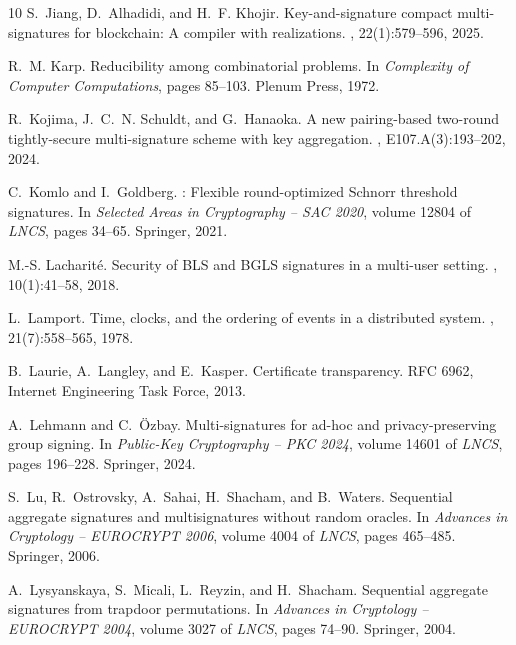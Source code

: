 \documentclass[11pt]{article}
\theoremstyle{definition}
\begin{document}
\begin{thebibliography}{10}
S.~Jiang, D.~Alhadidi, and H.~F. Khojir.
\newblock Key-and-signature compact multi-signatures for blockchain: A compiler
  with realizations.
,
  22(1):579--596, 2025.

R.~M. Karp.
\newblock Reducibility among combinatorial problems.
\newblock In {\em Complexity of Computer Computations}, pages 85--103. Plenum
  Press, 1972.

R.~Kojima, J.~C.~N. Schuldt, and G.~Hanaoka.
\newblock A new pairing-based two-round tightly-secure multi-signature scheme
  with key aggregation.
, E107.A(3):193--202, 2024.

C.~Komlo and I.~Goldberg.
: Flexible round-optimized {Schnorr} threshold signatures.
\newblock In {\em Selected Areas in Cryptography -- SAC 2020}, volume 12804 of
  {\em LNCS}, pages 34--65. Springer, 2021.

M.-S. Lacharit{\'e}.
\newblock Security of {BLS} and {BGLS} signatures in a multi-user setting.
, 10(1):41--58, 2018.

L.~Lamport.
\newblock Time, clocks, and the ordering of events in a distributed system.
, 21(7):558--565, 1978.

B.~Laurie, A.~Langley, and E.~Kasper.
\newblock Certificate transparency.
\newblock RFC 6962, Internet Engineering Task Force, 2013.

A.~Lehmann and C.~{\"O}zbay.
\newblock Multi-signatures for ad-hoc and privacy-preserving group signing.
\newblock In {\em Public-Key Cryptography -- PKC 2024}, volume 14601 of {\em
  LNCS}, pages 196--228. Springer, 2024.

S.~Lu, R.~Ostrovsky, A.~Sahai, H.~Shacham, and B.~Waters.
\newblock Sequential aggregate signatures and multisignatures without random
  oracles.
\newblock In {\em Advances in Cryptology -- EUROCRYPT 2006}, volume 4004 of
  {\em LNCS}, pages 465--485. Springer, 2006.

A.~Lysyanskaya, S.~Micali, L.~Reyzin, and H.~Shacham.
\newblock Sequential aggregate signatures from trapdoor permutations.
\newblock In {\em Advances in Cryptology -- EUROCRYPT 2004}, volume 3027 of
  {\em LNCS}, pages 74--90. Springer, 2004.


\end{thebibliography}
\end{document}
